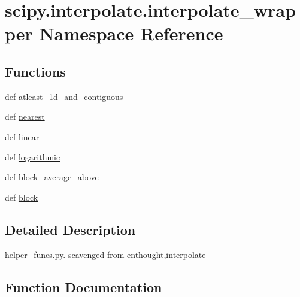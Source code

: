 \hypertarget{namespacescipy_1_1interpolate_1_1interpolate__wrapper}{}\section{scipy.\+interpolate.\+interpolate\+\_\+wrapper Namespace Reference}
\label{namespacescipy_1_1interpolate_1_1interpolate__wrapper}
\subsection*{Functions}
\begin{DoxyCompactItemize}
\item 
def \hyperlink{namespacescipy_1_1interpolate_1_1interpolate__wrapper_a0dacea9e01fb7b4a3b41efa050f56b1f}{atleast\+\_\+1d\+\_\+and\+\_\+contiguous}
\item 
def \hyperlink{namespacescipy_1_1interpolate_1_1interpolate__wrapper_a3534f8037469cceab45961b2d0a64a3a}{nearest}
\item 
def \hyperlink{namespacescipy_1_1interpolate_1_1interpolate__wrapper_adaac6e0cbc82e14236fa26dd2e1ecfca}{linear}
\item 
def \hyperlink{namespacescipy_1_1interpolate_1_1interpolate__wrapper_aeb98f1843296aa567a81ddf12547bd7b}{logarithmic}
\item 
def \hyperlink{namespacescipy_1_1interpolate_1_1interpolate__wrapper_aba6806de901f3b88526966350138d638}{block\+\_\+average\+\_\+above}
\item 
def \hyperlink{namespacescipy_1_1interpolate_1_1interpolate__wrapper_a536431086757ce64d1f612f32b488c3b}{block}
\end{DoxyCompactItemize}


\subsection{Detailed Description}
\begin{DoxyVerb}helper_funcs.py.
    scavenged from enthought,interpolate
\end{DoxyVerb}
 

\subsection{Function Documentation}
\hypertarget{namespacescipy_1_1interpolate_1_1interpolate__wrapper_a0dacea9e01fb7b4a3b41efa050f56b1f}{}
